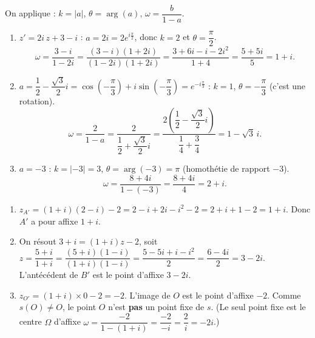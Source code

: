 \documentclass[11pt]{article}
\begin{document}
\begin{corrige}
On applique : $k = |a|$, $\theta = \arg(a)$, $\omega = \dfrac{b}{1-a}$.
\begin{enumerate}
\item $z' = 2i\,z + 3 - i$ : $a = 2i = 2e^{i\frac{\pi}{2}}$, donc $k = 2$ et $\theta = \dfrac{\pi}{2}$.
\[ \omega = \frac{3 - i}{1 - 2i} = \frac{(3-i)(1+2i)}{(1-2i)(1+2i)} = \frac{3 + 6i - i - 2i^2}{1+4} = \frac{5 + 5i}{5} = 1 + i. \]
\item $a = \dfrac{1}{2} - \dfrac{\sqrt{3}}{2}i = \cos\left(-\dfrac{\pi}{3}\right) + i\sin\left(-\dfrac{\pi}{3}\right) = e^{-i\frac{\pi}{3}}$ : $k = 1$, $\theta = -\dfrac{\pi}{3}$ (c'est une rotation).
\[ \omega = \frac{2}{1 - a} = \frac{2}{\dfrac{1}{2} + \dfrac{\sqrt{3}}{2}i} = \frac{2\left(\dfrac{1}{2} - \dfrac{\sqrt{3}}{2}i\right)}{\dfrac{1}{4} + \dfrac{3}{4}} = 1 - \sqrt{3}\,i. \]
\item $a = -3$ : $k = |-3| = 3$, $\theta = \arg(-3) = \pi$ (homothétie de rapport $-3$).
\[ \omega = \frac{8 + 4i}{1 - (-3)} = \frac{8 + 4i}{4} = 2 + i. \]
\end{enumerate}
\end{corrige}

\begin{corrige}
\begin{enumerate}
\item $z_{A'} = (1+i)(2-i) - 2 = 2 - i + 2i - i^2 - 2 = 2 + i + 1 - 2 = 1 + i$. Donc $A'$ a pour affixe $1 + i$.
\item On résout $3 + i = (1+i)z - 2$, soit $z = \dfrac{5 + i}{1+i} = \dfrac{(5+i)(1-i)}{(1+i)(1-i)} = \dfrac{5 - 5i + i - i^2}{2} = \dfrac{6 - 4i}{2} = 3 - 2i$. L'antécédent de $B'$ est le point d'affixe $3 - 2i$.
\item $z_{O'} = (1+i)\times 0 - 2 = -2$. L'image de $O$ est le point d'affixe $-2$. Comme $s(O) \neq O$, le point $O$ n'est \textbf{pas} un point fixe de $s$. (Le seul point fixe est le centre $\Omega$ d'affixe $\omega = \dfrac{-2}{1-(1+i)} = \dfrac{-2}{-i} = \dfrac{2}{i} = -2i$.)
\end{enumerate}
\end{corrige}
\end{document}
